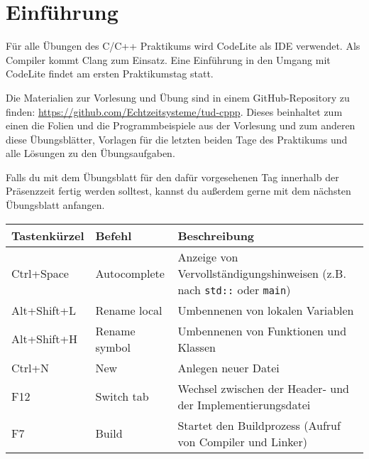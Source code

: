 \section*{Einführung}
Für alle Übungen des C/C++ Praktikums wird CodeLite als IDE verwendet. Als Compiler kommt Clang zum Einsatz.
Eine Einführung in den Umgang mit CodeLite findet am ersten Praktikumstag statt.

Die Materialien zur Vorlesung und Übung sind in einem GitHub-Repository zu finden: \url{https://github.com/Echtzeitsysteme/tud-cppp}.
Dieses beinhaltet zum einen die Folien und die Programmbeispiele aus der Vorlesung und zum anderen diese Übungsblätter, Vorlagen für die letzten beiden Tage des Praktikums und alle Lösungen zu den Übungsaufgaben.

Falls du mit dem Übungsblatt für den dafür vorgesehenen Tag innerhalb der Präsenzzeit fertig werden solltest, kannst du außerdem gerne mit dem nächsten Übungsblatt anfangen.



\begin{tabular}{l|l|p{11.5cm}}
    \toprule
    \textbf{Tastenkürzel} & \textbf{Befehl} & \textbf{Beschreibung}\\
    \midrule
	Ctrl+Space & Autocomplete &
	Anzeige von Vervollständigungshinweisen (z.B. nach \texttt{std::} oder \texttt{main})
	\\
	Alt+Shift+L & Rename local &
	Umbennenen von lokalen Variablen
	\\
	Alt+Shift+H & Rename symbol &
	Umbennenen von Funktionen und Klassen
	\\
	Ctrl+N & New &
	Anlegen neuer Datei
	\\
	F12 & Switch tab &
	Wechsel zwischen der Header- und der Implementierungsdatei
	\\
	F7 & Build &
	Startet den Buildprozess (Aufruf von Compiler und Linker)
    \\\bottomrule
\end{tabular}
